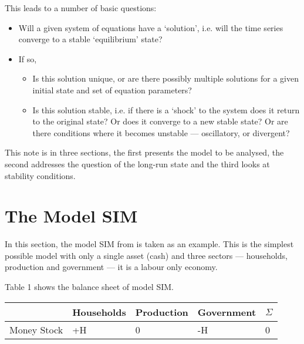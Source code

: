 \documentclass[twoside,a4paper,11pt]{article}
\begin{document}
This leads to a number of basic questions:
\renewcommand{\labelitemi}{\hspace{1cm}}
\renewcommand{\labelitemii}{\hspace{1cm}}
\begin{itemize}
\item Will a given system of equations have a \lq solution', i.e. will the time series converge to a stable \lq equilibrium' state?
\item If so,
   \begin{itemize}
   \item Is this solution unique, or are there possibly multiple solutions for a given initial state and set of equation parameters?
   \item Is this solution stable, i.e. if there is a \lq shock' to the system does it return to the original state? Or does it converge to a new stable state? Or are there conditions where it becomes unstable --- oscillatory, or divergent?
   \end{itemize}
\end{itemize}
 
This note is in three sections, the first presents the model to be analysed, the second addresses the question of the long-run state and the third looks at stability conditions. 

\section{The Model SIM}
In this section, the model SIM from \cite[chap.~3]{godleylavoie:2007} is taken as an example. This is the simplest possible model with only a single asset (cash) and three sectors --- households, production and government --- it is a labour only economy.

Table 1 shows the balance sheet of model SIM.
\begin{center}
\begin{tabular}{lllll}
\hline
& Households & Production & Government & $\Sigma$  \\
\hline
Money Stock & +H & 0 & -H & 0 \\
\hline
\end{tabular}
\end{center}
\end{document}
